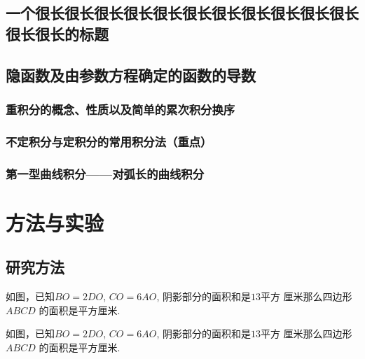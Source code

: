 \documentclass{USTBBook}
\begin{document}
\subsection{}
\zhlipsum[5]

\setcounter{chapter}{10}
\chapter{一个很长很长很长很长很长很长很长很长很长很长很长很长很长的标题}
\zhlipsum[1]

\chapter{隐函数及由参数方程确定的函数的导数}
\zhlipsum[6]

\cleardoublepage
\section{重积分的概念、性质以及简单的累次积分换序}
\zhlipsum[7]

\cleardoublepage
\section{不定积分与定积分的常用积分法（重点）}
\zhlipsum[8]

\cleardoublepage
\section{第一型曲线积分——对弧长的曲线积分}
\zhlipsum[9]

\part{方法与实验}


\chapter{研究方法} \label{cha:1}

\begin{question}
  如图，已知$BO=2DO$, $CO=6AO$, 阴影部分的面积和是$13$平方
  厘米那么四边形 $ABCD$ 的面积是\fillin[]平方厘米.
\end{question}

\begin{question}
  如图，已知$BO=2DO$, $CO=6AO$, 阴影部分的面积和是$13$平方
  厘米那么四边形 $ABCD$ 的面积是\fillin[]平方厘米.
\end{question}
\end{document}
